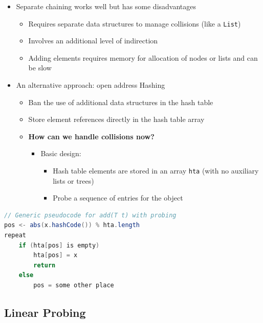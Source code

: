 \documentclass[
  10pt,
  english,
  letterpaper,
,tablecaptionabove
]{scrartcl}
\newcommand{\passthrough}[1]{#1}
\providecommand{\tightlist}{%
  \setlength{\itemsep}{0pt}\setlength{\parskip}{0pt}}
\begin{document}
\begin{itemize}
\tightlist
\item
  Separate chaining works well but has some disadvantages

  \begin{itemize}
  \tightlist
  \item
    Requires separate data structures to manage collisions (like a
    \passthrough{\lstinline!List!})
  \item
    Involves an additional level of indirection
  \item
    Adding elements requires memory for allocation of nodes or lists and
    can be slow
  \end{itemize}
\item
  An alternative approach: open address Hashing

  \begin{itemize}
  \tightlist
  \item
    Ban the use of additional data structures in the hash table
  \item
    Store element references directly in the hash table array
  \item
    \textbf{How can we handle collisions now?}

    \begin{itemize}
    \tightlist
    \item
      Basic design:

      \begin{itemize}
      \tightlist
      \item
        Hash table elements are stored in an array
        \passthrough{\lstinline!hta!} (with no auxiliary lists or trees)
      \item
        Probe a sequence of entries for the object
      \end{itemize}
    \end{itemize}
  \end{itemize}
\end{itemize}

\begin{lstlisting}[language=Java]
// Generic pseudocode for add(T t) with probing
pos <- abs(x.hashCode()) % hta.length
repeat
    if (hta[pos] is empty)
        hta[pos] = x
        return
    else
        pos = some other place
\end{lstlisting}

\hypertarget{linear-probing}{%
\subsection{Linear Probing}\label{linear-probing}}
\end{document}
